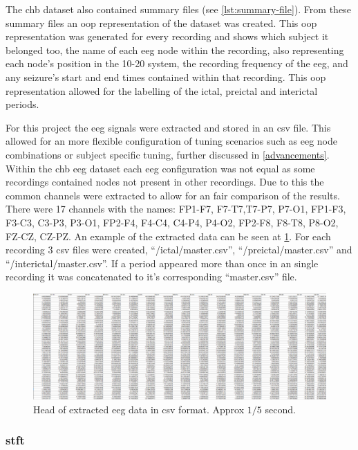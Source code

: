 \documentclass[12pt]{article}
\begin{document}
The \acrshort{chb} dataset also contained summary files (see \ref{lst:summary-file}). From these summary files an \acrfull{oop} representation of the dataset was created. This \acrshort{oop} representation was generated for every recording and shows which subject it belonged too, the name of each \acrshort{eeg} node within the recording, also representing each node's position in the 10-20 system, the recording frequency of the \acrshort{eeg}, and any seizure's start and end times contained within that recording. This \acrshort{oop} representation allowed for the labelling of the ictal, preictal and interictal periods.

For this project the \acrshort{eeg} signals were extracted and stored in an \acrshort{csv} file. This allowed for an more flexible configuration of tuning scenarios such as \acrshort{eeg} node combinations or subject specific tuning, further discussed in \ref{advancements}. Within the \acrshort{chb} \acrshort{eeg} dataset each \acrshort{eeg} configuration was not equal as some recordings contained nodes not present in other recordings. Due to this the common channels were extracted to allow for an fair comparison of the results. There were 17 channels with the names: FP1-F7, F7-T7,T7-P7, P7-O1, FP1-F3, F3-C3, C3-P3, P3-O1, FP2-F4, F4-C4, C4-P4, P4-O2, FP2-F8, F8-T8, P8-O2, FZ-CZ, CZ-PZ. An example of the extracted data can be seen at \ref{fig:rawData}. For each recording 3 \acrshort{csv} files were created, ``/ictal/master.csv'', ``/preictal/master.csv'' and ``/interictal/master.csv''. If a period appeared more than once in an single recording it was concatenated to it's corresponding ``master.csv'' file.


\begin{figure}[H]
\includegraphics[width=\textwidth]{rawData}
\centering
\caption{Head of extracted \acrshort{eeg} data in \acrshort{csv} format. Approx $1/5$ second.}
\label{fig:rawData}
\end{figure}


\subsubsection{\acrfull{stft}}
\end{document}
